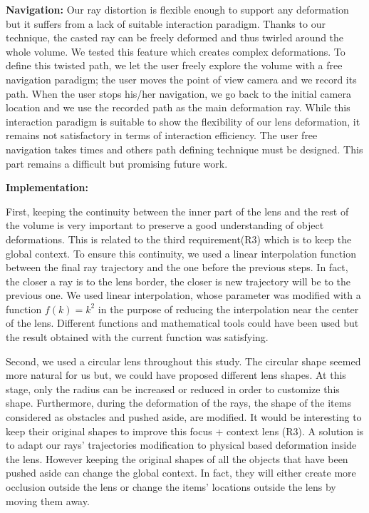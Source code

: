 \vspace{0.15cm}
\noindent\textbf{Navigation:} Our ray distortion is flexible enough to support any deformation but it suffers from a lack of suitable interaction paradigm. Thanks to our technique, the casted ray can be freely deformed and thus twirled around the whole volume. We tested this feature which creates complex deformations. To define this twisted path, we let the user freely explore the volume with a free navigation paradigm; the user moves the point of view camera and we record its path. When the user stops his/her navigation, we go back to the initial camera location and we use the recorded path as the main deformation ray. While this interaction paradigm is suitable to show the flexibility of our lens deformation, it remains not satisfactory in terms of interaction efficiency. The user free navigation takes times and others path defining technique must be designed. This part remains a difficult but promising future work.

\vspace{0.15cm}
\noindent\textbf{Implementation:}

First, keeping the continuity between the inner part of the lens and the rest of the volume is very important to preserve a good understanding of object deformations. This is related to the third requirement(R3) which is to keep the global context. To ensure this continuity, we used a linear interpolation function between the final ray trajectory and the one before the previous steps. In fact, the closer a ray is to the lens border, the closer is new trajectory will be to the previous one. We used linear interpolation, whose parameter was modified with a function $ f\left(k\right) = k^2$ in the purpose of reducing the interpolation near the center of the lens. Different functions and mathematical tools could have been used but the result obtained with the current function was satisfying.

Second, we used a circular lens throughout this study. The circular shape seemed more natural for us but, we could have proposed different lens shapes. At this stage, only the radius can be increased or reduced in order to customize this shape. Furthermore, during the deformation of the rays, the shape of the items considered as obstacles and pushed aside, are modified. It would be interesting to keep their original shapes to improve this focus + context lens (R3). A solution is to adapt our rays' trajectories modification to physical based deformation inside the lens. However keeping the original shapes of all the objects that have been pushed aside can change the global context. In fact, they will either create more occlusion outside the lens or change the items' locations outside the lens by moving them away.  


